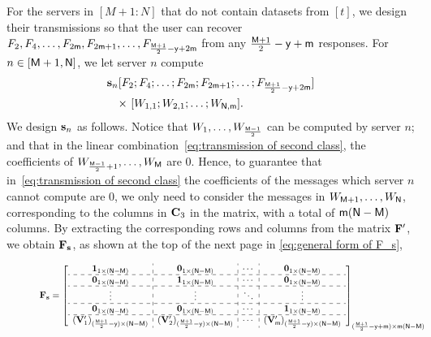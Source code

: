 \documentclass[conference,letterpaper]{IEEEtran}
\begin{document}
For the servers in $[M+1 : N]$ that do not contain datasets from $[t]$, we design their transmissions so that the user can recover $F_2, F_4, \ldots, F_{2{\sf m}}, F_{2{\sf m}+1}, \ldots, F_{\frac{{\sf M}+1}{2} - {\sf y} + 2{\sf m}}$ from any $\frac{{\sf M}+1}{2} - {\sf y} + {\sf m}$ responses.
 For $n \in [{\sf M}+1, {\sf N}]$, we let server $n$ compute
\begin{align}
{\bf s}_n  & [ F_2; F_4; \ldots; F_{2{\sf m}}; F_{2{\sf m}+1}; \ldots; F_{\frac{{\sf M}+1}{2} - {\sf y} + 2{\sf m}} ]  \nonumber \\
& \text{× }  [ W_{1,1}; W_{2,1}; \ldots; W_{{\sf N},{\sf m}} ] .
\label{eq:transmission of second class}
\end{align}
We design ${\bf s}_{n} $ as follows.
Notice that $W_1, \ldots, W_{\frac{{\sf M}-1}{2}}$ can be computed by server $n$; and that in the linear combination~\eqref{eq:transmission of second class}, the coefficients of $W_{\frac{{\sf M}-1}{2}+1}, \ldots, W_{{\sf M}}$ are $0$. 
Hence, to guarantee that in~\eqref{eq:transmission of second class} the coefficients of the messages which server $n$ cannot compute are $0$, we only need to consider the messages in $W_{{\sf M}+1}, \ldots, W_{{\sf N}}$, corresponding to the columns in ${\bf C}_3$ in the matrix, with a total of ${\sf m} ({\sf N} - {\sf M})$ columns.
By extracting the corresponding rows and columns from the matrix \( {\bf F}' \), we obtain \( {\bf F}_{\bf s} \), as shown at the top of the next page in \eqref{eq:general form of F_s},
\begin{figure}
\begin{equation}
\scalebox{0.8}{$
 {\bf F}_{\bf s} = 
\left[
\begin{array}{c:c:c:c}
{\bf 1}_{1 \times (\Nsf-\Msf)}  & {\bf 0}_{1 \times (\Nsf-\Msf)}  & \cdots & {\bf 0}_{1 \times (\Nsf-\Msf)}   \\ \hdashline
{\bf 0}_{1 \times (\Nsf-\Msf)} &  {\bf 1}_{1 \times (\Nsf-\Msf)}   & \cdots & {\bf 0}_{1 \times (\Nsf-\Msf)}   \\ \hdashline 
 \vdots   & \vdots  &  \ddots & \vdots \\ \hdashline
 {\bf 0}_{1 \times (\Nsf-\Msf)} &   {\bf 0}_{1 \times (\Nsf-\Msf)}    & \cdots &  {\bf 1}_{1 \times (\Nsf-\Msf)} \\ \hdashline
 ({\bf V}'_{1})_{ (\frac{\Msf + 1}{2} - \ysf) \times (\Nsf-\Msf)}  &  ({\bf V}'_{2})_{ (\frac{\Msf + 1}{2} - \ysf) \times (\Nsf-\Msf)}  &   \cdots   &   ({\bf V}'_{\msf})_{ (\frac{\Msf + 1}{2} - \ysf) \times (\Nsf-\Msf)} 
 \end{array}
\right]_{(\frac{\Msf + 1}{2} - \ysf + \msf) \times \msf(\Nsf-\Msf)}
$}
\label{eq:general form of F_s}
\end{equation}

\end{figure}
\end{document}
